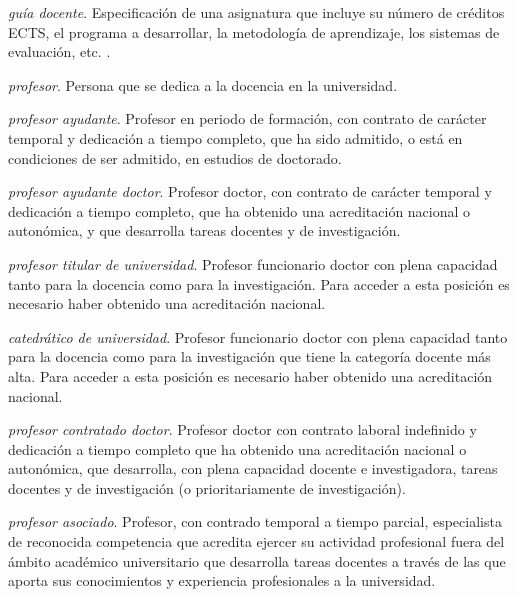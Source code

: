     \item \emph{guía docente}. Especificación de una asignatura que incluye su
        número de créditos ECTS, el programa a desarrollar, la metodología de
        aprendizaje, los sistemas de evaluación, etc. \cite[sección
        D.5]{guiaMadridMasD}.

    \item \emph{profesor}. Persona que se dedica a la docencia en la
        universidad.

    \item \emph{profesor ayudante}. Profesor en periodo de formación, con
        contrato de carácter temporal y dedicación a tiempo completo, que ha
        sido admitido, o está en condiciones de ser admitido, en estudios de
        doctorado\cite[artículo 49]{leyUniversidades}. 

    \item \emph{profesor ayudante doctor}. Profesor doctor, con contrato de
        carácter temporal y dedicación a tiempo completo, que ha obtenido una
        acreditación nacional o autonómica, y que desarrolla tareas docentes y de
        investigación\cite[artículo 50]{leyUniversidades}.  

    \item \emph{profesor titular de universidad}. Profesor funcionario doctor con plena
        capacidad tanto para la docencia como para la
        investigación. Para acceder a esta posición es necesario haber obtenido
        una acreditación nacional\cite{leyUniversidades}.

    \item \emph{catedrático de universidad}. Profesor funcionario doctor con plena
        capacidad tanto para la docencia como para la investigación que tiene
        la categoría docente más alta. Para acceder a esta posición es
        necesario haber obtenido una acreditación nacional\cite{leyUniversidades}.

    \item \emph{profesor contratado doctor}. Profesor doctor con contrato
        laboral indefinido y dedicación a tiempo completo que ha obtenido una
        acreditación nacional o autonómica, que desarrolla, con plena capacidad
        docente e investigadora, tareas docentes y de investigación (o
        prioritariamente de investigación)\cite[artículo 52]{leyUniversidades}.

    \item \emph{profesor asociado}. Profesor, con contrado temporal a tiempo
        parcial, especialista de reconocida competencia que acredita ejercer su
        actividad profesional fuera del ámbito académico universitario que
        desarrolla tareas docentes a través de las que aporta sus conocimientos
        y experiencia profesionales a la universidad\cite[artículo 53]{leyUniversidades}.

